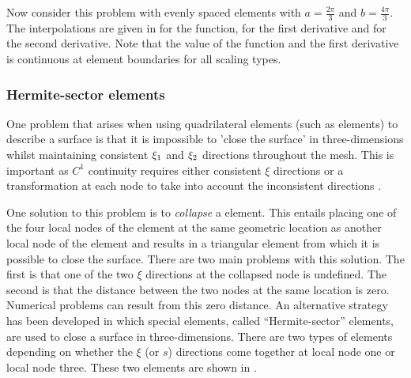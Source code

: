Now consider this problem with evenly spaced elements \ie with
$a=\frac{2\pi}{3}$ and $b=\frac{4\pi}{3}$. The interpolations are given in
 for the function, 
for the first derivative and  for the second
derivative. Note that the value of the function and the first derivative is
continuous at element boundaries for all scaling types.


\subsubsection{Hermite-sector elements}
\label{sec:hselements}

One problem that arises when using quadrilateral elements (such as
\bicubicherm elements) to describe a surface is that it is impossible to
'close the surface' in three-dimensions whilst maintaining consistent $\xi_{1}$
and $\xi_{2}$ directions throughout the mesh. This is important as $C^{1}$
continuity requires either consistent $\xi$ directions or a transformation at
each node to take into account the inconsistent directions \cite{petera:1994}.

One solution to this problem is to \emph{collapse} a \bicubicherm element.
This entails placing one of the four local nodes of the element at the same
geometric location as another local node of the element and results in a
triangular element from which it is possible to close the surface. There are
two main problems with this solution.  The first is that one of the two $\xi$
directions at the collapsed node is undefined.  The second is that the
distance between the two nodes at the same location is zero.  Numerical
problems can result from this zero distance.  An alternative strategy has
been developed in which special elements, called ``Hermite-sector''
elements, are used to close a \bicubicherm
surface in three-dimensions. There are two types of elements depending on
whether the $\xi$ (or $s$) directions come together at local node one or local
node three.  These two elements are shown in .

